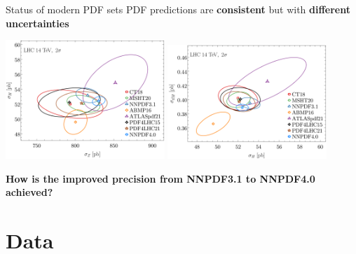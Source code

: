 \documentclass[aspectratio=169,9pt]{beamer}
\begin{document}
\begin{frame}{Status of modern PDF sets}
    PDF predictions are {\bfseries consistent} but with {\bfseries different uncertainties}
	\begin{center}
		\includegraphics[width=0.45\textwidth]{ZH_xsec_fixed.png}
		\includegraphics[width=0.45\textwidth]{HttbarH_xsec_fixed.png}
	\end{center}
    \begin{center}
	    \textbf{How is the improved precision from NNPDF3.1 to NNPDF4.0 achieved?}
	\end{center}
\end{frame}



\section{Data}

\end{document}
